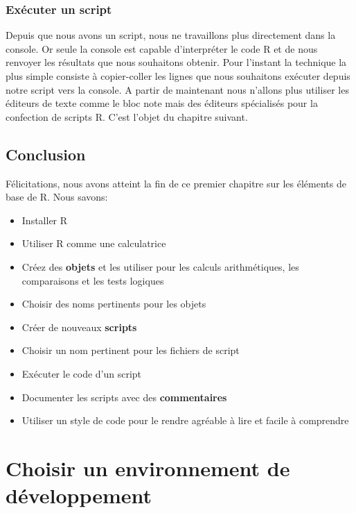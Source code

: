 \documentclass[twoside,symmetric]{book}
\providecommand{\tightlist}{%
  \setlength{\itemsep}{0pt}\setlength{\parskip}{0pt}}
\begin{document}
\hypertarget{exuxe9cuter-un-script}{%
\subsection{Exécuter un script}\label{exuxe9cuter-un-script}}

Depuis que nous avons un script, nous ne travaillons plus directement dans la console. Or seule la console est capable d'interpréter le code R et de nous renvoyer les résultats que nous souhaitons obtenir. Pour l'instant la technique la plus simple consiste à copier-coller les lignes que nous souhaitons exécuter depuis notre script vers la console. A partir de maintenant nous n'allons plus utiliser les éditeurs de texte comme le bloc note mais des éditeurs spécialisés pour la confection de scripts R. C'est l'objet du chapitre suivant.

\hypertarget{conclusion}{%
\section{Conclusion}\label{conclusion}}

Félicitations, nous avons atteint la fin de ce premier chapitre sur les éléments de base de R. Nous savons:

\begin{itemize}
\tightlist
\item
  Installer R
\item
  Utiliser R comme une calculatrice
\item
  Créez des \textbf{objets} et les utiliser pour les calculs arithmétiques, les comparaisons et les tests logiques
\item
  Choisir des noms pertinents pour les objets
\item
  Créer de nouveaux \textbf{scripts}
\item
  Choisir un nom pertinent pour les fichiers de script
\item
  Exécuter le code d'un script
\item
  Documenter les scripts avec des \textbf{commentaires}
\item
  Utiliser un style de code pour le rendre agréable à lire et facile à comprendre
\end{itemize}

\hypertarget{IDE}{%
\chapter{Choisir un environnement de développement}\label{IDE}}
\end{document}
